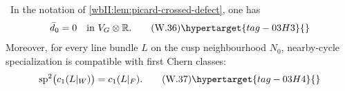 \begin{lemma}
\hypertarget{tag-03ID}{}\label{wbII:lem:picard-cusp-defect}

\ In the notation of
\cref{wbII:lem:picard-crossed-defect}, one has
\[
 \bar d_0=0\quad\text{in }V_G\otimes\mathbb R.
\tag{W.36}\hypertarget{tag-03H3}{}\label{wbII:eq:W:5.17n}
\]
Moreover, for every line bundle $L$ on the cusp neighbourhood $N_0$,
nearby-cycle specialization is compatible with first Chern classes:
\[
 \operatorname{sp}^2\bigl(c_1(L|_W)\bigr)=c_1(L|_F).
\tag{W.37}\hypertarget{tag-03H4}{}\label{wbII:eq:W:5.17o}
\]
\end{lemma}




